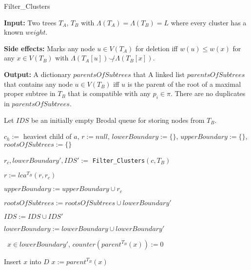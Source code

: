 \documentclass{article}
\newcommand{\compatible}{\smile}
\newcommand{\leafset}{\Lambda}
\begin{document}
    \begin{algorithm}
        \caption{Filter\_Clusters}
        \label{alg:filterclusters}

        \begin{algorithmic}[1]
            \State \textbf{Input:} Two trees $T_A$, $T_B$ with $\leafset(T_A) = \leafset(T_B) = L$ where every cluster has a known $weight$.

            \State \textbf{Side effects:} Marks any node $u \in V(T_A)$ for deletion iff $w(u) \leq w(x)$ for any $x \in V(T_B)$ with $\leafset(T_A[u]) \not\compatible \leafset(T_B[x])$.

            \State \textbf{Output:} A dictionary $parentsOfSubtrees$ that
             A linked list $parentsOfSubtrees$ that contains any node $u \in V(T_B)$ iff $u$ is the parent of the root of a maximal proper subtree in $T_B$ that is compatible with any $p_i \in \pi$. There are no duplicates in $parentsOfSubtrees$.

            \State Let $IDS$ be an initially empty Brodal queue for storing nodes from $T_B$.

            \State $c_h :=$ heaviest child of $a$, $r := null$, $lowerBoundary := \{\}$, $upperBoundary := \{\}$, $rootsOfSubtrees := \{\}$

                \State $r_c, lowerBoundary', IDS' :=$ \texttt{Filter\_Clusters}$(c, T_B)$

                \State $r := lca^{T_B}(r, r_c)$

                \State $upperBoundary := upperBoundary \cup r_c$

                \State $rootsOfSubtrees := rootsOfSubtrees \cup lowerBoundary'$

                \State $IDS := IDS \cup IDS'$

                    \State $lowerBoundary := lowerBoundary \cup lowerBoundary'$

                    \State \algorithmicforall\ $x \in lowerBoundary'$, $counter(parent^{T_B}(x)) := 0$
                \EndIf
            \EndFor

                    \State Insert $x$ into $D$
                    \State $x := parent^{T_B}(x)$
                \EndWhile
            \EndFor


\end{algorithmic}
\end{algorithm}
\end{document}
